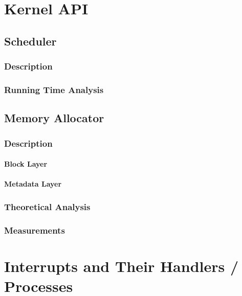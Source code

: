 \documentclass[12pt]{report}
\begin{document}
\part{Kernel API}

\chapter{Scheduler}

\section{Description}

\section{Running Time Analysis}

\chapter{Memory Allocator}

\section{Description}

\subsection{Block Layer}

\subsection{Metadata Layer}

\section{Theoretical Analysis}

\section{Measurements}

\part{Interrupts and Their Handlers / Processes}
\end{document}
